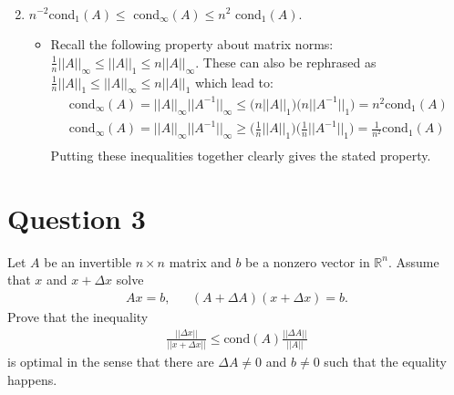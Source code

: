 \documentclass[10pt,a4paper]{article}
\theoremstyle{definition}
\theoremstyle{definition}
\numberwithin{equation}{section}
\begin{document}
\begin{enumerate}[label = (\alph*)]
\begin{itemize}
\begin{align*}
	\end{align*}
	\end{itemize}
\item $n^{-2}$cond$_1(A) \leq $ cond$_\infty (A) \leq n^2$ cond$_1(A)$. 
	\begin{itemize}
	\item Recall the following property about matrix norms: $\frac{1}{n}||A||_\infty \leq ||A||_1 \leq n ||A||_\infty$. These can also be rephrased as $\frac{1}{n}||A||_1 \leq ||A||_\infty \leq n||A||_1$ which lead to:
	\begin{align*}
	\text{cond}_\infty (A) = ||A||_\infty ||A^{-1}||_\infty \leq \bigg(n||A||_1 \bigg) \bigg(n ||A^{-1}||_1 \bigg) = n^2 \text{cond}_1(A)\\
	\text{cond}_\infty (A) = ||A||_\infty ||A^{-1}||_\infty \geq \bigg(\frac{1}{n}||A||_1 \bigg) \bigg(\frac{1}{n} ||A^{-1}||_1 \bigg) = \frac{1}{n^2} \text{cond}_1(A)\\
	\end{align*}
	Putting these inequalities together clearly gives the stated property. 
	\end{itemize}
\end{enumerate}


\section*{Question 3}
Let $A$ be an invertible $n \times n$ matrix and $b$ be a nonzero vector in $\mathbb{R}^n$. Assume that $x$ and $x + \Delta x$ solve
\begin{align*}
Ax = b, && (A + \Delta A)(x + \Delta x) = b.
\end{align*}
Prove that the inequality
\begin{align*}
\frac{||\Delta x||}{||x + \Delta x||} \leq \text{cond}(A)\frac{||\Delta A||}{||A||}
\end{align*}
is optimal in the sense that there are $\Delta A \neq 0$ and $b \neq 0$ such that the equality happens. 
\end{document}
